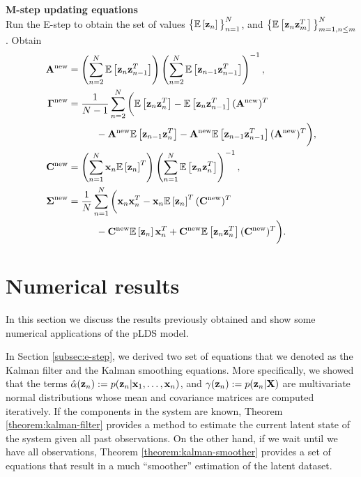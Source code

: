 \documentclass[12pt, oneside]{book}
\numberwithin{equation}{section}
\newcommand{\expectation}[1]{\mathbb{E}\left[#1\right]}
\newcommand{\x}{{\bf x}}
\newcommand{\z}{{\bf z}}
\begin{document}
{\begin{tcolorbox}
\textbf{M-step updating equations}\\
	Run the E-step to obtain the set of values $\big\{\expectation{\z_n}\big\}_{n=1}^N$, and $\big\{\expectation{\z_n\z_m^T}\big\}_{m=1, n\leq m}^N$ . Obtain
	\begin{align}
		{\bf A}^{\text{\normalfont new}} &= \left(\sum_{n=2}^N \expectation{\z_n \z_{n-1}^T}\right)\left(\sum_{n=2}^N \expectation{\z_{n-1}\z_{n-1}^T}\right)^{-1} \label{eq:mstep-A-final},\\
		\boldsymbol{\Gamma}^{\text{\normalfont new}} &= \frac{1}{N-1}\sum_{n=2}^N\bigg( \expectation{\z_n \z_n^T} - \expectation{\z_n \z_{n-1}^T}({\bf A}^{\text{\normalfont new}})^T \nonumber\\
		&\hspace{1cm} - {\bf A}^{\text{\normalfont new}}\expectation{\z_{n-1}\z_n^T} - {\bf A}^{\text{\normalfont new}}\expectation{\z_{n-1} \z_{n-1}^T}({\bf A}^{\text{\normalfont new}})^T \bigg), \label{eq:mstep-Gamma-final}\\
		{\bf C}^{\text{\normalfont new}} &= \left(\sum_{n=1}^N \x_n \expectation{\z_n}^T \right)\left(\sum_{n=1}^N \expectation{\z_n \z_n^T} \right)^{-1}, \label{eq:mstep-C-final}\\
		\boldsymbol{\Sigma}^{\text{\normalfont new}} &= \frac{1}{N}\sum_{n=1}^N\bigg(\x_n\x_n^T - \x_n \expectation{\z_n}^T ({\bf C}^{\text{\normalfont new}})^T \nonumber\\
		&\hspace{1cm} - {\bf C}^{\text{\normalfont new}}\expectation{\z_n}\x_n^T + {\bf C}^{\text{\normalfont new}} \expectation{\z_n \z_n^T}({\bf C}^{\text{\normalfont new}})^T \bigg). \label{eq:mstep-Sigma-final}
	\end{align}
\end{tcolorbox}

\chapter{Numerical results}
In this section we discuss the results previously obtained and show some numerical applications of the pLDS model.

In Section \ref{subsec:e-step}, we derived two set of equations that we denoted as the Kalman filter and the Kalman smoothing equations. More specifically, we showed that the terms $\hat\alpha(\z_n) := p(\z_n \vert \x_1, \ldots, \x_n)$, and $\gamma(\z_n) := p(\z_n\vert {\bf X})$ are multivariate normal distributions whose mean and covariance matrices are computed iteratively. If the components in the system are known, Theorem \ref{theorem:kalman-filter} provides a method to estimate the current latent state of the system given all past observations. On the other hand, if we wait until we have all observations, Theorem \ref{theorem:kalman-smoother} provides a set of equations that result in a much ``smoother'' estimation of the latent dataset.

}
\end{document}
